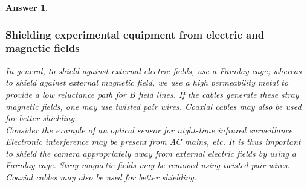 \documentclass[a4paper]{article}
\newtheorem{ans}{Answer}[subsection]
\theoremstyle{new}
\begin{document}
\begin{ans}
\subsubsection*{Shielding experimental equipment from electric and magnetic fields}
In general, to shield against external electric fields, use a Faraday cage; whereas to shield against external magnetic field, we use a high permeability metal to provide a low reluctance path for B field lines. If the cables generate these stray magnetic fields, one may use twisted pair wires. Coaxial cables may also be used for better shielding.\\[5pt]
Consider the example of an optical sensor for night-time infrared surveillance. Electronic interference may be present from AC mains, etc. It is thus important to shield the camera appropriately away from external electric fields by using a Faraday cage. Stray magnetic fields may be removed using twisted pair wires. Coaxial cables may also be used for better shielding.
\end{ans}
\newpage
\end{document}
